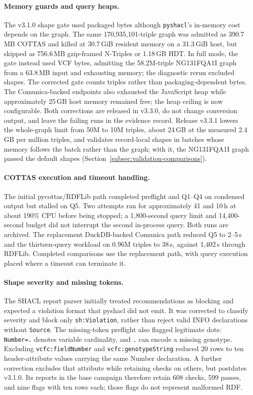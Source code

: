\documentclass[11pt]{article}
\begin{document}
\paragraph{Memory guards and query heaps.}
The v3.1.0 shape gate used packaged bytes although \texttt{pyshacl}'s in-memory cost depends on the graph.
The same 170,935,101-triple graph was admitted as 390.7\,MB COTTAS and killed at 30.7\,GiB resident memory on a 31.3\,GiB host, but skipped as 756.6\,MB gzip-framed N-Triples or 1.18\,GB HDT.
In full mode, the gate instead used VCF bytes, admitting the 58.2M-triple NG131FQA1I graph from a 63.8\,MB input and exhausting memory; the diagnostic rerun excluded shapes.
The corrected gate counts triples rather than packaging-dependent bytes.
The Comunica-backed endpoints also exhausted the JavaScript heap while approximately 25\,GB host memory remained free; the heap ceiling is now configurable.
Both corrections are released in v3.3.0, do not change conversion output, and leave the failing runs in the evidence record.
Release v3.3.1 lowers the whole-graph limit from 50M to 10M triples, about 24\,GB at the measured 2.4\,GB per million triples, and validates record-local shapes in batches whose memory follows the batch rather than the graph; with it, the NG131FQA1I graph passed the default shapes (Section~\ref{subsec:validation-comparisons}).

\paragraph{COTTAS execution and timeout handling.}
The initial pycottas/RDFLib path completed preflight and Q1--Q4 on condensed output but stalled on Q5.
Two attempts ran for approximately 41 and 10\,h at about 190\% CPU before being stopped; a 1,800-second query limit and 14,400-second budget did not interrupt the second in-process query.
Both runs are archived.
The replacement DuckDB-backed Comunica path reduced Q5 to 2--5\,s and the thirteen-query workload on 0.96M triples to 38\,s, against 1,402\,s through RDFLib.
Completed comparisons use the replacement path, with query execution placed where a timeout can terminate it.

\paragraph{Shape severity and missing tokens.}
The SHACL report parser initially treated recommendations as blocking and expected a violation format that pyshacl did not emit.
It was corrected to classify severity and block only \texttt{sh:Violation}, rather than reject valid INFO declarations without \texttt{Source}.
The missing-token preflight also flagged legitimate dots: \texttt{Number=.} denotes variable cardinality, and \texttt{.} can encode a missing genotype.
Excluding \texttt{vcfc:fieldNumber} and \texttt{vcfc:genotypeString} reduced 20 rows to ten header-attribute values carrying the same Number declaration.
A further correction excludes that attribute while retaining checks on others, but postdates v3.1.0.
Its reports in the base campaign therefore retain 608 checks, 599 passes, and nine flags with ten rows each; those flags do not represent malformed RDF.
\end{document}
